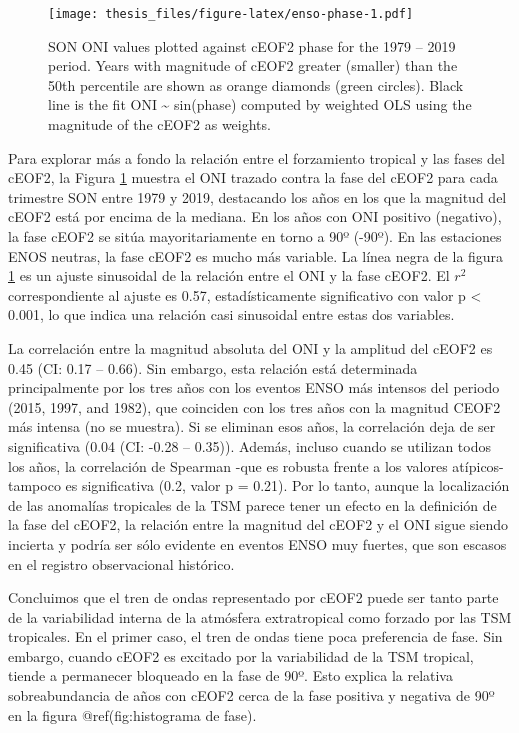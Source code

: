 \documentclass[12pt,oneside]{reedthesis}
\begin{document}
\begin{figure}
\centering
\texttt{[image: thesis\_files/figure-latex/enso-phase-1.pdf]}
\caption{\label{fig:enso-phase}SON ONI values plotted against cEOF2 phase for the 1979 -- 2019 period. Years with magnitude of cEOF2 greater (smaller) than the 50th percentile are shown as orange diamonds (green circles). Black line is the fit ONI \textasciitilde{} sin(phase) computed by weighted OLS using the magnitude of the cEOF2 as weights.}
\end{figure}
Para explorar más a fondo la relación entre el forzamiento tropical y las fases del cEOF2, la Figura \ref{fig:enso-phase} muestra el ONI trazado contra la fase del cEOF2 para cada trimestre SON entre 1979 y 2019, destacando los años en los que la magnitud del cEOF2 está por encima de la mediana.
En los años con ONI positivo (negativo), la fase cEOF2 se sitúa mayoritariamente en torno a 90º (-90º).
En las estaciones ENOS neutras, la fase cEOF2 es mucho más variable.
La línea negra de la figura \ref{fig:enso-phase} es un ajuste sinusoidal de la relación entre el ONI y la fase cEOF2.
El \(r^2\) correspondiente al ajuste es 0.57, estadísticamente significativo con valor p \textless{} 0.001, lo que indica una relación casi sinusoidal entre estas dos variables.

La correlación entre la magnitud absoluta del ONI y la amplitud del cEOF2 es 0.45 (CI: 0.17 -- 0.66).
Sin embargo, esta relación está determinada principalmente por los tres años con los eventos ENSO más intensos del periodo (2015, 1997, and 1982), que coinciden con los tres años con la magnitud CEOF2 más intensa (no se muestra).
Si se eliminan esos años, la correlación deja de ser significativa (0.04 (CI: -0.28 -- 0.35)).
Además, incluso cuando se utilizan todos los años, la correlación de Spearman -que es robusta frente a los valores atípicos- tampoco es significativa (0.2, valor p = 0.21).
Por lo tanto, aunque la localización de las anomalías tropicales de la TSM parece tener un efecto en la definición de la fase del cEOF2, la relación entre la magnitud del cEOF2 y el ONI sigue siendo incierta y podría ser sólo evidente en eventos ENSO muy fuertes, que son escasos en el registro observacional histórico.

Concluimos que el tren de ondas representado por cEOF2 puede ser tanto parte de la variabilidad interna de la atmósfera extratropical como forzado por las TSM tropicales.
En el primer caso, el tren de ondas tiene poca preferencia de fase.
Sin embargo, cuando cEOF2 es excitado por la variabilidad de la TSM tropical, tiende a permanecer bloqueado en la fase de 90º.
Esto explica la relativa sobreabundancia de años con cEOF2 cerca de la fase positiva y negativa de 90º en la figura @ref(fig:histograma de fase).
\end{document}
